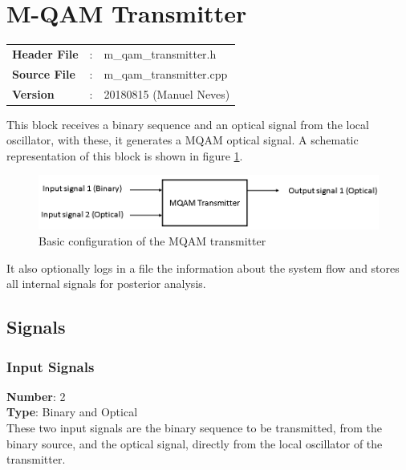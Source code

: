 \clearpage

\section{M-QAM Transmitter}

\begin{tcolorbox}	
	\begin{tabular}{p{2.75cm} p{0.2cm} p{10.5cm}} 	
		\textbf{Header File}   &:& m\_qam\_transmitter.h \\
		\textbf{Source File}   &:& m\_qam\_transmitter.cpp \\
        \textbf{Version}       &:& 20180815 (Manuel Neves)\\
	\end{tabular}
\end{tcolorbox}

This block receives a binary sequence and an optical signal from the local oscillator, with these, it generates a MQAM optical signal. A schematic representation of this block is shown in figure \ref{MQAM_transmitter_block_diagram_simple}.

\begin{figure}[H]
	\centering \includegraphics[width=1\textwidth]{./lib/m_qam_transmitter/figures/MQAM_transmitter_block_diagram_simple}
	\caption{Basic configuration of the MQAM transmitter}\label{MQAM_transmitter_block_diagram_simple}
\end{figure}
It also optionally logs in a file the information about the system flow and stores all internal signals for posterior analysis.

\subsection*{Signals}
\begin{subs}
\subsubsection*{Input Signals}
\end{subs}
\hspace*{0.5in}\textbf{Number}: 2\\
\hspace*{0.5in}\textbf{Type}: Binary and Optical
\\
These two input signals are the binary sequence to be transmitted, from the binary source, and the optical signal, directly from the local oscillator of the transmitter.

